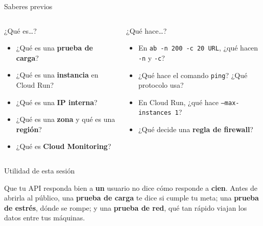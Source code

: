 \documentclass[aspectratio=169,10pt,c]{beamer}
\begin{document}
\begin{frame}{Saberes previos}
\begin{columns}[T,onlytextwidth]
\begin{block}{¿Qué es…?}
\begin{itemize}\setlength\itemsep{8pt}
  \item ¿Qué es una \textbf{prueba de carga}?
  \item ¿Qué es una \textbf{instancia} en Cloud Run?
  \item ¿Qué es una \textbf{IP interna}?
  \item ¿Qué es una \textbf{zona} y qué es una \textbf{región}?
  \item ¿Qué es \textbf{Cloud Monitoring}?
\end{itemize}
\end{block}
\begin{block}{¿Qué hace…?}
\begin{itemize}\setlength\itemsep{8pt}
  \item En \texttt{ab -n 200 -c 20 URL}, ¿qué hacen \texttt{-n} y \texttt{-c}?
  \item ¿Qué hace el comando \texttt{ping}? ¿Qué protocolo usa?
  \item En Cloud Run, ¿qué hace \texttt{--max-instances 1}?
  \item ¿Qué decide una \textbf{regla de firewall}?
\end{itemize}
\end{block}
\end{columns}
\end{frame}

\begin{frame}[c]{Utilidad de esta sesión}
\begin{center}
\begin{minipage}{.84\textwidth}
{\large Que tu API responda bien a \textbf{un} usuario no dice cómo responde a \textbf{cien}. Antes de abrirla al público, una \textbf{prueba de carga} te dice si cumple tu meta; una \textbf{prueba de estrés}, dónde se rompe; y una \textbf{prueba de red}, qué tan rápido viajan los datos entre tus máquinas.}
\end{minipage}
\end{center}
\end{frame}
\end{document}
